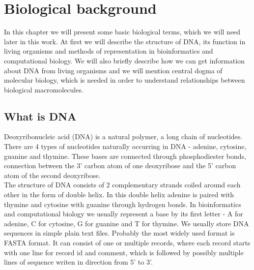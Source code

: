 \chapter{Biological background}
In this chapter we will present some basic biological terms, which we will need later in this work.
At first we will describe the structure of DNA, its function in living organisms
and methods of representation in bioinformatics and computational biology.
We will also briefly describe how we can get information about DNA from living organisms and we will mention central dogma of molecular biology, which is needed in order to understand relationships between biological macromolecules.

\section{What is DNA}
Deoxyribonucleic acid (DNA) is a natural polymer, a long chain of nucleotides. There are 4 types of nucleotides
naturally occurring in DNA - adenine, cytosine, guanine and thymine. These bases are connected through phosphodiester bonds,
connection between the 3' carbon atom of one deoxyribose and the 5' carbon atom of the second deoxyribose. \\
The structure of DNA consists of 2 complementary strands coiled around each other in the form of double helix.
In this double helix adenine is paired with thymine and cytosine with guanine through hydrogen bonds.
In bioinformatics and computational biology we usually represent a base by its first letter - A for adenine, C for cytosine, G for guanine and T for thymine.
We usually store DNA sequences in simple plain text files. Probably the most widely used format is FASTA format.
It can consist of one or multiple records, where each record starts with one line for record id and comment, which is followed by possibly multiple lines of sequence writen in direction from 5' to 3'.


